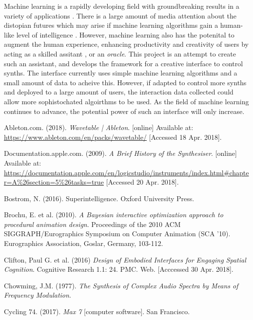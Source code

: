 \documentclass[11pt, oneside]{report}   	%
\begin{document}
{Machine learning is a rapidly developing field with groundbreaking results in a variety of applications \cite{Automation}. There is a large amount of media attention about the distopian futures which may arise if machine learning algorithms gain a human-like level of intelligence \cite{Bostrom}. However, machine learning also has the potenital to augment the human experience, enhancing productivity and creativity of users by acting as a skilled assitant \cite{AudioEffects2}, or an \emph{oracle}. This project is an attempt to create such an assistant, and develops the framework for a creative interface to control synths. The interface currently uses simple machine learning algorithms and a small amount of data to acheive this. However, if adapted to control more synths and deployed to a large amount of users, the interaction data collected could allow more sophistochated algoirthms to be used. As the field of machine learning continues to advance, the potential power of such an interface will only increase.

\begin{thebibliography}{9}
\singlespacing

Ableton.com. (2018). \emph{Wavetable | Ableton}. [online] Available at: \url{https://www.ableton.com/en/packs/wavetable/} [Accessed 18 Apr. 2018].

Documentation.apple.com. (2009). \emph{A Brief History of the Synthesiser}. [online] Available at: \url{https://documentation.apple.com/en/logicstudio/instruments/index.html#chapter=A\%26section=5\%26tasks=true} [Accessed 20 Apr. 2018].

Bostrom, N. (2016). Superintelligence. Oxford University Press.

Brochu, E. et al. (2010). \emph{A Bayesian interactive optimization approach to procedural animation design}. Proceedings of the 2010 ACM SIGGRAPH/Eurographics Symposium on Computer Animation (SCA '10). Eurographics Association, Goslar, Germany, 103-112.

Clifton, Paul G. et al. (2016) \emph{Design of Embodied Interfaces for Engaging Spatial Cognition}. Cognitive Research 1.1: 24. PMC. Web. [Acccessed 30 Apr. 2018].

Chowming, J.M. (1977). \emph{The Synthesis of Complex Audio Spectra by Means of Frequency Modulation}.

Cycling 74. (2017). \emph{Max 7} [computer software]. San Francisco.


\end{thebibliography}}
\end{document}
